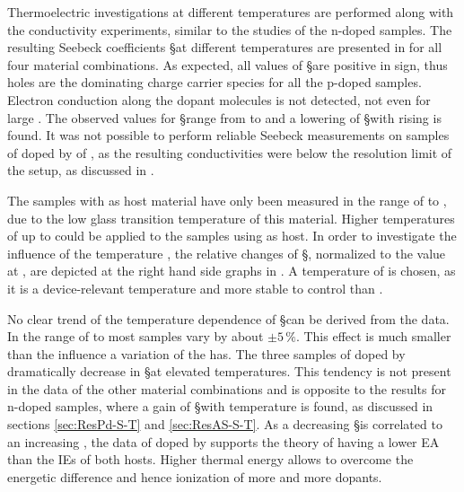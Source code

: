 %
%
Thermoelectric investigations at different temperatures are performed along with the conductivity experiments, similar to the studies of the n-doped samples. The resulting Seebeck coefficients \S at different temperatures are presented in  for all four material combinations. As expected, all values of \S are positive in sign, thus holes are the dominating charge carrier species for all the p-doped samples. Electron conduction along the dopant molecules is not detected, not even for large \CLongs. The observed values for \S range from  to  and a lowering of \S with rising \CLong is found. It was not possible to perform reliable Seebeck measurements on samples of \lili doped by  of \CSF, as the resulting conductivities were below the resolution limit of the setup, as discussed in .

The samples with \meo as host material have only been measured in the range of \Tm[30] to , due to the low glass transition temperature of this material. Higher temperatures of up to \Tm[80] could be applied to the samples using \lili as host.
In order to investigate the influence of the temperature \Tm, the relative changes of \S, normalized to the value at \Tm[40], are depicted at the right hand side graphs in . A temperature of  is chosen, as it is a device-relevant temperature and more stable to control than \Tm[30].

No clear trend of the temperature dependence of \S can be derived from the data. In the range of \Tm[30] to  most samples vary by about $\pm5\,\%$.
This effect is much smaller than the influence a variation of the \CLong has.
The three samples of \lili doped by \CSF dramatically decrease in \S at elevated temperatures. This tendency is not present in the data of the other material combinations and is opposite to the results for n-doped \CS samples, where a gain of \S with temperature is found, as discussed in sections \ref{sec:ResPd-S-T} and \ref{sec:ResAS-S-T}. As a decreasing \S is correlated to an increasing \nhLong, the data of \lili doped by \CSF supports the theory of \CSF having a lower EA than the IEs of both hosts. Higher thermal energy allows to overcome the energetic difference and hence ionization of more and more dopants.

